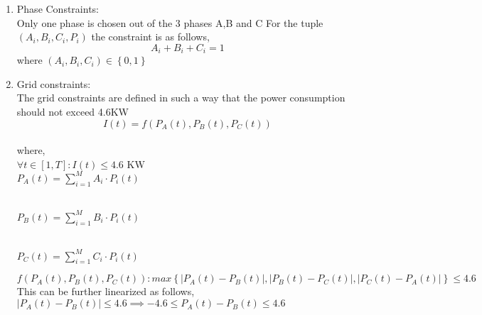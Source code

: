 \documentclass{article}
\begin{document}
 \begin{enumerate}
     \item Phase Constraints: \\
     Only one phase is chosen out of the 3 phases A,B and C
    For the tuple \(( A_i, B_i, C_i, P_i )\) the constraint is as follows, \\
    \[ A_i+B_i+C_i =1\]
    where  \( (A_i,B_i,C_i) \in \left\{0,1\right\} \)
     \item Grid constraints: \\
     The grid constraints are defined in such a way that the power consumption should not exceed 4.6KW
     \[ I(t) = f \left( P_A(t),P_B(t),P_C(t)\right)\]\\
     where,\\
     \(\forall t \in [1 , T] : I(t) \leq 4.6 \) KW \\[0.2cm]
     \( P_A(t) = \sum_{i=1}^{M} A_i \cdot P_i(t) \) \\ 
     \begin{comment} where,  \( I_{Q_{i},A} = \begin{cases}
        1 , & \text{if } \phi_i = A \\
        0 , & \text{else}
        \end{cases}\)
        \end{comment} 
    \\  \( P_B(t) = \sum_{i=1}^{M} B_i \cdot P_i(t) \) \\ 
     \begin{comment} where,  \( I_{Q_{i},B} = \begin{cases}
        1 , & \text{if } \phi_i = B \\
        0 , & \text{else}
        \end{cases}\)
        \end{comment} 
        \\ \( P_C(t) = \sum_{i=1}^{M} C_i \cdot P_i(t) \) \\
        \begin{comment}where,  \( I_{Q_{i},C} = \begin{cases}
        1 , & \text{if } \phi_i = C \\
        0 , & \text{else}
        \end{cases}\) 
        \end{comment}
         \[f ( P_A(t),P_B(t),P_C(t)) : max \left\{ |P_A(t)-P_B(t)|,|P_B(t)-P_C(t)|,|P_C(t)-P_A(t)| \right\} \leq 4.6 \] 
    This can be further linearized as follows,\\[0.2cm]
    \(|P_A(t)-P_B(t)|\leq 4.6 \implies -4.6 \leq P_A(t)-P_B(t) \leq 4.6 \)\\[0.2cm]

\end{enumerate}
\end{document}
